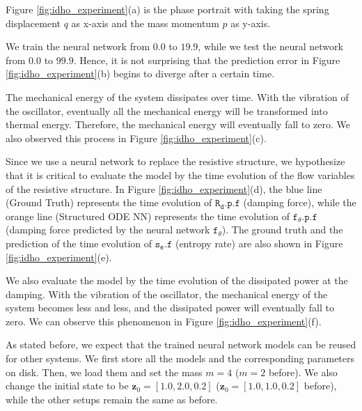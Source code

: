 \documentclass[
	parskip, 			   %
	twoside, 			   %
	DIV=14, 			   %
	BCOR=15.0mm, 		   %
	headsepline, 		   %
	open=right, 		   %
	captions=tableheading, %
	bibliography=totoc,    %
	numbers=noenddot       %
]{scrreprt}
\begin{document}
Figure \ref{fig:idho_experiment}(a) is the phase portrait with taking the spring displacement $q$ as x-axis and the mass momentum $p$ as y-axis.

We train the neural network from $0.0$ to $19.9$, while we test the neural network from $0.0$ to $99.9$. Hence, it is not surprising that the prediction error in Figure \ref{fig:idho_experiment}(b) begins to diverge after a certain time.

The mechanical energy of the system dissipates over time. With the vibration of the oscillator, eventually all the mechanical energy will be transformed into thermal energy. Therefore, the mechanical energy will eventually fall to zero. We also observed this process in Figure \ref{fig:idho_experiment}(c).

Since we use a neural network to replace the resistive structure, we hypothesize that it is critical to evaluate the model by the time evolution of the flow variables of the resistive structure. In Figure \ref{fig:idho_experiment}(d), the blue line (Ground Truth) represents the time evolution of $\mathtt{R_{d}.p.f}$ (damping force), while the orange line (Structured ODE NN) represents the time evolution of $\mathtt{f_{\theta}.p.f}$ (damping force predicted by the neural network $\mathtt{f_{\theta}}$). The ground truth and the prediction of the time evolution of $\mathtt{s_e.f}$ (entropy rate) are also shown in Figure \ref{fig:idho_experiment}(e).

We also evaluate the model by the time evolution of the dissipated power at the damping. With the vibration of the oscillator, the mechanical energy of the system becomes less and less, and the dissipated power will eventually fall to zero. We can observe this phenomenon in Figure \ref{fig:idho_experiment}(f).

As stated before, we expect that the trained neural network models can be reused for other systems. We first store all the models and the corresponding parameters on disk. Then, we load them and set the mass $m=4$ ($m=2$ before). We also change the initial state to be $\mathbf{z}_{0} = [1.0, 2.0, 0.2]$ ($\mathbf{z}_{0} = [1.0, 1.0, 0.2]$ before), while the other setups remain the same as before.
\end{document}
